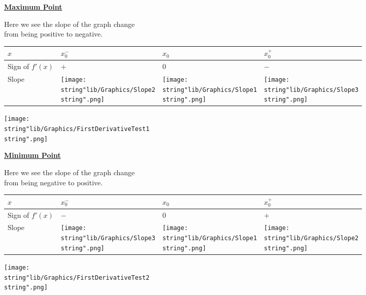 \documentclass[11pt,a4paper]{book}
\begin{document}
\begin{minipage}[t]{0.6\textwidth}

\textbf{\uline{Maximum Point}}

\medskip

Here we see the slope of the graph change\\
from being positive to negative.

\setlength{\extrarowheight}{2pt}%
\begin{tabular}[t]{|>{\centering}m{1.8cm}|>{\centering}m{1.3cm}|>{\centering}m{1.3cm}|>{\centering}m{1.3cm}|}
\hline
$x$ & $x_{0}^{-}$ & $x_{0}$ & $x_{0}^{+}$\tabularnewline
\hline
Sign of $f'(x)$ & $+$ & $0$ & $-$\tabularnewline
\hline
Slope & \texttt{[image: \\string"lib/Graphics/Slope2\\string".png]} & \texttt{[image: \\string"lib/Graphics/Slope1\\string".png]} & \texttt{[image: \\string"lib/Graphics/Slope3\\string".png]}\tabularnewline
\hline
\end{tabular}

\end{minipage}
\begin{minipage}[t]{0.4\textwidth}
\begin{center}
\texttt{[image: \\string"lib/Graphics/FirstDerivativeTest1\\string".png]}
\par\end{center}

\end{minipage}

\begin{minipage}[t]{0.6\textwidth}

\textbf{\uline{Minimum Point}}

\medskip

Here we see the slope of the graph change\\
from being negative to positive.

\setlength{\extrarowheight}{2pt}%
\begin{tabular}[t]{|>{\centering}m{1.8cm}|>{\centering}m{1.3cm}|>{\centering}m{1.3cm}|>{\centering}m{1.3cm}|}
\hline
$x$ & $x_{0}^{-}$ & $x_{0}$ & $x_{0}^{+}$\tabularnewline
\hline
Sign of $f'(x)$ & $-$ & $0$ & $+$\tabularnewline
\hline
Slope & \texttt{[image: \\string"lib/Graphics/Slope3\\string".png]} & \texttt{[image: \\string"lib/Graphics/Slope1\\string".png]} & \texttt{[image: \\string"lib/Graphics/Slope2\\string".png]}\tabularnewline
\hline
\end{tabular}

\end{minipage}
\begin{minipage}[t]{0.4\textwidth}
\begin{center}
\texttt{[image: \\string"lib/Graphics/FirstDerivativeTest2\\string".png]}
\par\end{center}

\end{minipage}
\end{document}
